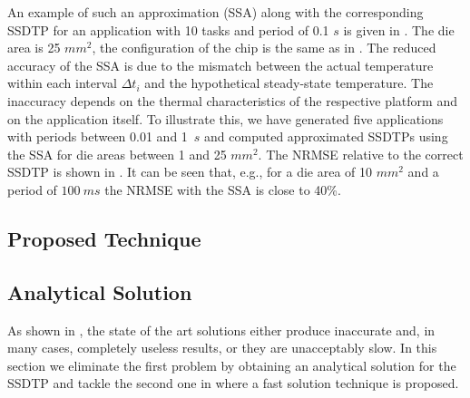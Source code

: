 An example of such an approximation (SSA) along with the corresponding SSDTP for
an application with 10 tasks and period of 0.1 $s$ is given in
. The die area is 25 $mm^2$, the configuration
of the chip is the same as in . The reduced accuracy of the SSA
is due to the mismatch between the actual temperature within each interval
$\Delta t_i$ and the hypothetical steady-state temperature. The inaccuracy
depends on the thermal characteristics of the respective platform and on the
application itself. To illustrate this, we have generated five applications with
periods between 0.01 and 1~$s$ and computed approximated SSDTPs using the SSA
for die areas between 1 and 25 $mm^2$. The NRMSE relative to the correct SSDTP
is shown in . It can be seen that, e.g., for a die area
of 10 $mm^2$ and a period of $100~ms$ the NRMSE with the SSA is close to 40\%.

\subsection{Proposed Technique}

\subsection{Analytical Solution}

As shown in , the state of the art solutions either
produce inaccurate and, in many cases, completely useless results, or they are
unacceptably slow. In this section we eliminate the first problem by obtaining
an analytical solution for the SSDTP and tackle the second one in
 where a fast solution technique is proposed.

